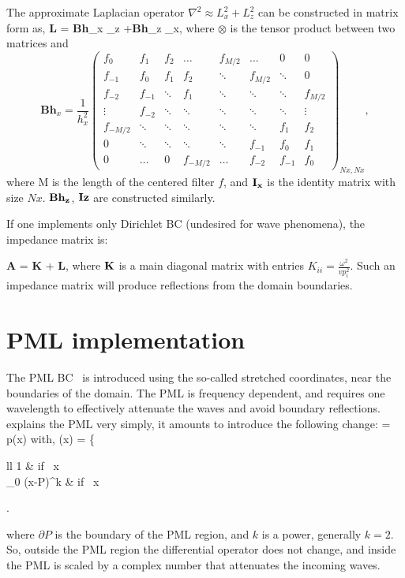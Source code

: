 \documentclass[10pt]{article}
\newcommand{\twopartdef}[4]
{
 \left\{
   \begin{array}{ll}
     #1 & \mbox{if } #2 \\
     #3 & \mbox{if } #4
   \end{array}
 \right.
}
\begin{document}
The approximate Laplacian operator $\nabla^2 \approx L_x^2 + L_z^2$ can be constructed in matrix form as,
\beq
{\bf L} = {\bf Bh}_x _z +{\bf Bh}_z _x,
\label{eq:Lop}
\eeq
 where $\otimes$ is the tensor product between two matrices and 
\begin{equation}
\mathbf{Bh}_x=\frac{1}{h_x^2}
 \begin{pmatrix}
  f_0     & f_1     &  f_2    & \dots   & f_{M/2} & \dots   & 0      & 0       \\
  f_{-1}  & f_0     &  f_1    & f_2     & \ddots  & f_{M/2} & \ddots & 0       \\
  f_{-2}  & f_{-1}  & \ddots  & f_1     & \ddots  &  \ddots & \ddots & f_{M/2} \\
  \vdots  & f_{-2}  & \ddots  & \ddots  & \ddots  & \ddots  & \ddots & \vdots  \\   
  f_{-M/2}& \ddots  & \ddots  & \ddots  & \ddots  & \ddots  & f_1    & f_2    \\   
  0       & \ddots  & \ddots  & \ddots  & \ddots  & f_{-1}  & f_0    & f_1    \\   
  0       & \dots   & 0       & f_{-M/2}& \dots   & f_{-2}  & f_{-1} & f_0       
 \end{pmatrix}_{Nx,Nx},
\label{eq:B}
\end{equation}
where M is the length of the centered filter $f$, and $\bf I_x$ is the identity matrix with size $Nx$. $\bf Bh_z$, $\bf Iz$ are constructed
similarly.


If one implements only Dirichlet BC (undesired for wave phenomena), the impedance matrix is:

\beq
{\bf A} = {\bf K} + {\bf L},
\eeq
where $\bf K$ is a main diagonal matrix with entries $K_{ii} = \frac{\omega^2}{vp_i^2}$. Such an impedance matrix
will produce reflections from the domain boundaries.

\section{PML implementation}

The PML BC~\cite{BerengerPML} is introduced using the so-called stretched coordinates, near the
boundaries of the domain. The PML is frequency dependent, and requires one wavelength to effectively attenuate
the waves and avoid boundary reflections.~\cite{notesPML} explains the PML very simply, it amounts to introduce
the following change:
\beq
   \rightarrow {} = p(x) 
\eeq 
with,
\beq
\sigma(x) = \twopartdef{1}{ x \not{}}{\sigma_0 (x-{\partial P})^k}{ x\in {PML}}
\eeq
where $\partial P$ is the boundary of the PML region, and $k$ is a power, generally $k=2$. So, outside the PML
region the differential operator does not change, and inside the PML is scaled by a complex number that attenuates
the incoming waves.
\end{document}
